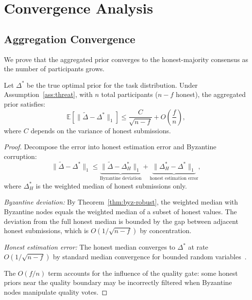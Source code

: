 \section{Convergence Analysis}

\label{sec:convergence}

\subsection{Aggregation Convergence}

We prove that the aggregated prior converges to the honest-majority consensus
as the number of participants grows.

\begin{theorem}
\label{thm:convergence}
Let $\Delta^*$ be the true optimal prior for the task distribution. Under
Assumption~\ref{ass:threat}, with $n$ total participants ($n - f$ honest), the
aggregated prior satisfies:
\begin{equation}
    \mathbb{E}\left[\|\tilde{\Delta} - \Delta^*\|_1\right]
    \leq \frac{C}{\sqrt{n - f}} + O\left(\frac{f}{n}\right),
\end{equation}
where $C$ depends on the variance of honest submissions.
\end{theorem}

\begin{proof}
Decompose the error into honest estimation error and Byzantine corruption:
\begin{equation}
    \|\tilde{\Delta} - \Delta^*\|_1
    \leq \underbrace{\|\tilde{\Delta} - \Delta_H^*\|_1}_{\text{Byzantine deviation}}
    + \underbrace{\|\Delta_H^* - \Delta^*\|_1}_{\text{honest estimation error}},
\end{equation}
where $\Delta_H^*$ is the weighted median of honest submissions only.

\textit{Byzantine deviation:} By Theorem~\ref{thm:byz-robust}, the weighted
median with Byzantine nodes equals the weighted median of a subset of honest
values. The deviation from the full honest median is bounded by the gap between
adjacent honest submissions, which is $O(1/\sqrt{n-f})$ by concentration.

\textit{Honest estimation error:} The honest median converges to $\Delta^*$ at
rate $O(1/\sqrt{n-f})$ by standard median convergence for bounded random
variables~\cite{minsker2015geometric}.

The $O(f/n)$ term accounts for the influence of the quality gate: some honest
priors near the quality boundary may be incorrectly filtered when Byzantine
nodes manipulate quality votes.
\end{proof}

